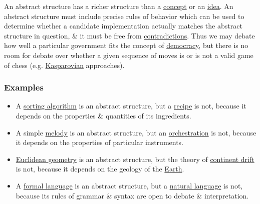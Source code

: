 \documentclass{article}
\begin{document}
An abstract structure has a richer structure than a \href{https://en.wikipedia.org/wiki/Concept}{concept} or an \href{https://en.wikipedia.org/wiki/Idea}{idea}. An abstract structure must include precise rules of behavior which can be used to determine whether a candidate implementation actually matches the abstract structure in question, \& it must be free from \href{https://en.wikipedia.org/wiki/Contradiction}{contradictions}. Thus we may debate how well a particular government fits the concept of \href{https://en.wikipedia.org/wiki/Democracy}{democracy}, but there is no room for debate over whether a given sequence of moves is or is not a valid game of chess (e.g. \href{https://en.wikipedia.org/wiki/Kasparov}{Kasparovian} approaches).

\subsubsection{Examples}

\begin{itemize}
	\item A \href{https://en.wikipedia.org/wiki/Sorting_algorithm}{sorting algorithm} is an abstract structure, but a \href{https://en.wikipedia.org/wiki/Recipe}{recipe} is not, because it depends on the properties \& quantities of its ingredients.
	\item A simple \href{https://en.wikipedia.org/wiki/Melody}{melody} is an abstract structure, but an \href{https://en.wikipedia.org/wiki/Orchestration}{orchestration} is not, because it depends on the properties of particular instruments.
	\item \href{https://en.wikipedia.org/wiki/Euclidean_geometry}{Euclidean geometry} is an abstract structure, but the theory of \href{https://en.wikipedia.org/wiki/Continental_drift}{continent drift} is not, because it depends on the geology of the \href{https://en.wikipedia.org/wiki/Earth}{Earth}.
	\item A \href{https://en.wikipedia.org/wiki/Formal_language}{formal language} is an abstract structure, but a \href{https://en.wikipedia.org/wiki/Natural_language}{natural language} is not, because its rules of grammar \& syntax are open to debate \& interpretation.
\end{itemize}
\end{document}
